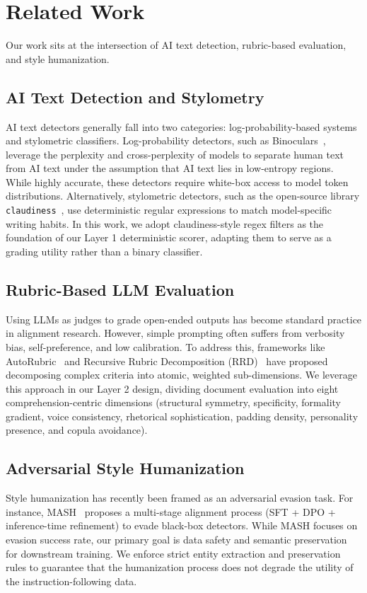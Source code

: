 \documentclass{article}
\begin{document}
\section{Related Work}
Our work sits at the intersection of AI text detection, rubric-based evaluation, and style humanization.

\subsection{AI Text Detection and Stylometry}
AI text detectors generally fall into two categories: log-probability-based systems and stylometric classifiers. Log-probability detectors, such as Binoculars~\citep{binoculars2024}, leverage the perplexity and cross-perplexity of models to separate human text from AI text under the assumption that AI text lies in low-entropy regions. While highly accurate, these detectors require white-box access to model token distributions. Alternatively, stylometric detectors, such as the open-source library \texttt{claudiness}~\citep{claudiness}, use deterministic regular expressions to match model-specific writing habits. In this work, we adopt claudiness-style regex filters as the foundation of our Layer 1 deterministic scorer, adapting them to serve as a grading utility rather than a binary classifier.

\subsection{Rubric-Based LLM Evaluation}
Using LLMs as judges to grade open-ended outputs has become standard practice in alignment research. However, simple prompting often suffers from verbosity bias, self-preference, and low calibration. To address this, frameworks like AutoRubric~\citep{autorubric2026} and Recursive Rubric Decomposition (RRD)~\citep{rrd2026rethinking} have proposed decomposing complex criteria into atomic, weighted sub-dimensions. We leverage this approach in our Layer 2 design, dividing document evaluation into eight comprehension-centric dimensions (structural symmetry, specificity, formality gradient, voice consistency, rhetorical sophistication, padding density, personality presence, and copula avoidance).

\subsection{Adversarial Style Humanization}
Style humanization has recently been framed as an adversarial evasion task. For instance, MASH~\citep{gu2026mash} proposes a multi-stage alignment process (SFT + DPO + inference-time refinement) to evade black-box detectors. While MASH focuses on evasion success rate, our primary goal is data safety and semantic preservation for downstream training. We enforce strict entity extraction and preservation rules to guarantee that the humanization process does not degrade the utility of the instruction-following data.
\end{document}
